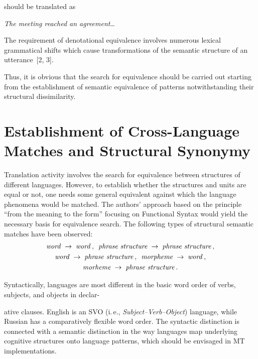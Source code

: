 \begin{multicols}{2}
     \noindent
     should be translated as 
     
  \begin{center}
          \textit{The meeting reached an agreement}\ldots
          \end{center}
     
     
     The requirement of denotational equivalence involves numerous lexical 
grammatical shifts which cause transformations of the semantic structure of an 
utterance~[2, 3]. 
     
     Thus, it is obvious that the search for equivalence should be carried out 
starting from the establishment of semantic equivalence of patterns notwithstanding 
their structural dissimilarity. 

\section{Establishment of Cross-Language Matches and Structural 
Synonymy}
     
     \noindent
     Translation activity involves the search for equivalence between structures 
of different languages. However, to establish whether the structures and units are 
equal or not, one needs some general equivalent against which the language 
phenomena would be matched. The authors' approach based on the principle ``from the 
meaning to the form'' focusing on Functional Syntax would yield the necessary 
basis for equivalence search.  The following types of structural semantic matches 
have been observed:
    \begin{gather*}
     \mbox{\textit{word}}\;\rightarrow\;\mbox{\textit{word}}\,,\enskip
     \mbox{\textit{phrase structure}}\;\rightarrow\;\mbox{\textit{phrase 
structure}}\,,\\
     \mbox{\textit{word}}\;\rightarrow\;\mbox{\textit{phrase 
structure}}\,,\enskip
     \mbox{\textit{morpheme}}\;\rightarrow\;\mbox{\textit{word}}\,,\\
     \mbox{\textit{morheme}}\;\rightarrow\;\mbox{\textit{phrase structure}}\,.
     \end{gather*}
     
     Syntactically, languages are most different in the basic word order of verbs, 
subjects, and objects in declar-\linebreak\vspace*{-12pt}
\columnbreak

\noindent
ative clauses. English is an SVO (i.\,e., 
\textit{Subject--Verb--Object}) language, while Russian has a comparatively flexible 
word order. The syntactic distinction is connected with a semantic distinction in 
the way languages map underlying cognitive structures onto language patterns, 
which should be envisaged in MT implementations.
     

\end{multicols}
